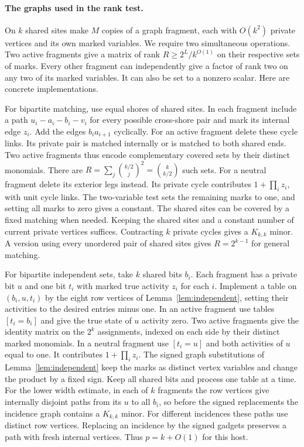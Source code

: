 \documentclass[11pt]{article}
\theoremstyle{definition}
\begin{document}
\paragraph{The graphs used in the rank test.}
On \(k\) shared sites make \(M\) copies of a graph fragment, each with \(O(k^2)\) private vertices and its own marked variables. We require two simultaneous operations. Two active fragments give a matrix of rank \(R\ge 2^L/k^{O(1)}\) on their respective sets of marks. Every other fragment can independently give a factor of rank two on any two of its marked variables. It can also be set to a nonzero scalar. Here are concrete implementations.

For bipartite matching, use equal shores of shared sites. In each fragment include a path \(u_i-a_i-b_i-v_i\) for every possible cross-shore pair and mark its internal edge \(z_i\). Add the edges \(b_i a_{i+1}\) cyclically. For an active fragment delete these cycle links. Its private pair is matched internally or is matched to both shared ends. Two active fragments thus encode complementary covered sets by their distinct monomials. There are \(R=\sum_j\binom{k/2}j^2=\binom k{k/2}\) such sets. For a neutral fragment delete its exterior legs instead. Its private cycle contributes \(1+\prod_i z_i\), with unit cycle links. The two-variable test sets the remaining marks to one, and setting all marks to zero gives a constant. The shared sites can be covered by a fixed matching when needed. Keeping the shared sites and a constant number of current private vertices suffices. Contracting \(k\) private cycles gives a \(K_{k,k}\) minor. A version using every unordered pair of shared sites gives \(R=2^{k-1}\) for general matching.

For bipartite independent sets, take \(k\) shared bits \(b_i\). Each fragment has a private bit \(u\) and one bit \(t_i\) with marked true activity \(z_i\) for each \(i\). Implement a table on \((b_i,u,t_i)\) by the eight row vertices of Lemma~\ref{lem:independent}, setting their activities to the desired entries minus one. In an active fragment use tables \([t_i=b_i]\) and give the true state of \(u\) activity zero. Two active fragments give the identity matrix on the \(2^k\) assignments, indexed on each side by their distinct marked monomials. In a neutral fragment use \([t_i=u]\) and both activities of \(u\) equal to one. It contributes \(1+\prod_i z_i\). The signed graph substitutions of Lemma~\ref{lem:independent} keep the marks as distinct vertex variables and change the product by a fixed sign. Keep all shared bits and process one table at a time. For the lower width estimate, in each of \(k\) fragments the row vertices give internally disjoint paths from its \(u\) to all \(b_i\), so before the signed replacements the incidence graph contains a \(K_{k,k}\) minor. For different incidences these paths use distinct row vertices. Replacing an incidence by the signed gadgets preserves a path with fresh internal vertices. Thus \(p=k+O(1)\) for this host.
\end{document}
